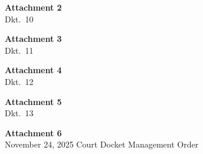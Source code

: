 \documentclass[14pt]{extarticle}
\newcommand{\MandamusDktTenPdf}{Civil/Filing/motion-summons-efiling-instructions.pdf}%
\newcommand{\MandamusDktElevenPdf}{Civil/Filing/motion-expedite-ifp-summons.pdf}%
\newcommand{\MandamusDktTwelvePdf}{Civil/Injunction/motion-ifp-screening-service.pdf}%
\newcommand{\MandamusDktThirteenPdf}{Civil/Filing/emergency-motion-modify-referral.pdf}%
\newcommand{\MandamusDktThirteenOrderPdf}{Civil/Filing/proposed-order-modify-referral.pdf}%
\newcommand{\MandamusDocketManagementOrderPdf}{Civil/Mandamus/Attachments/11.24.25-Docket-Management-Order-revised-to-remove-DII.pdf}%
\newcommand{\MandamusDktTenPdf}{../Filing/motion-summons-efiling-instructions.pdf}%
\newcommand{\MandamusDktElevenPdf}{../Filing/motion-expedite-ifp-summons.pdf}%
\newcommand{\MandamusDktTwelvePdf}{../Injunction/motion-ifp-screening-service.pdf}%
\newcommand{\MandamusDktThirteenPdf}{../Filing/emergency-motion-modify-referral.pdf}%
\newcommand{\MandamusDktThirteenOrderPdf}{../Filing/proposed-order-modify-referral.pdf}%
\newcommand{\MandamusDocketManagementOrderPdf}{Attachments/11.24.25-Docket-Management-Order-revised-to-remove-DII.pdf}%
\begin{document}
\clearpage
\thispagestyle{empty}
\vspace*{2.2in}
\begin{center}
{\LARGE\bfseries Attachment 2}\\[0.5em]
{\large Dkt.\ 10}
\end{center}


\clearpage
\thispagestyle{empty}
\vspace*{2.2in}
\begin{center}
{\LARGE\bfseries Attachment 3}\\[0.5em]
{\large Dkt.\ 11}
\end{center}


\clearpage
\thispagestyle{empty}
\vspace*{2.2in}
\begin{center}
{\LARGE\bfseries Attachment 4}\\[0.5em]
{\large Dkt.\ 12}
\end{center}


\clearpage
\thispagestyle{empty}
\vspace*{2.2in}
\begin{center}
{\LARGE\bfseries Attachment 5}\\[0.5em]
{\large Dkt.\ 13}
\end{center}



\clearpage
\thispagestyle{empty}
\vspace*{2.2in}
\begin{center}
{\LARGE\bfseries Attachment 6}\\[0.5em]
{\large November 24, 2025 Court Docket Management Order}
\end{center}

\end{document}
